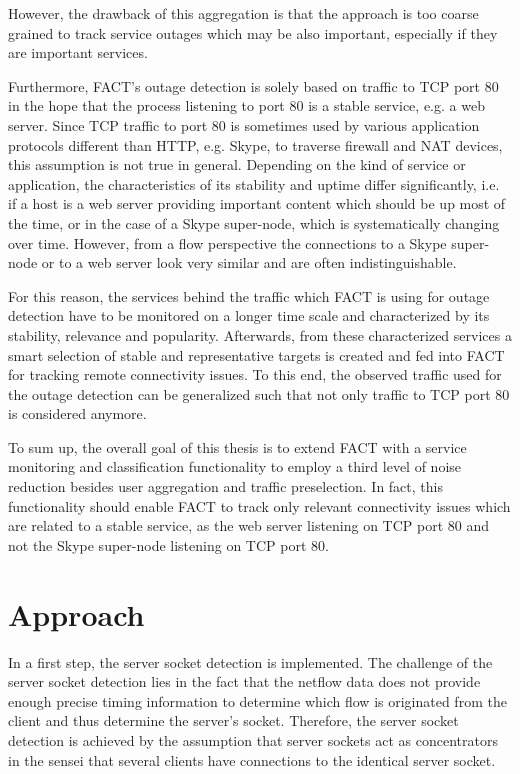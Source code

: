 \documentclass{sigcomm-alternate}
\begin{document}
However, the drawback of this aggregation is that the approach is too
coarse grained to track service outages which may be also important,
especially if they are important services.

Furthermore, FACT's outage detection is solely based on traffic to
TCP port 80 in the hope that the process listening to port 80 is a
stable service, e.g. a web server. Since TCP traffic to port 80 is
sometimes used by various application protocols different than HTTP,
e.g. Skype, to traverse firewall and NAT devices, this assumption is
not true in general. Depending on the kind of service or application,
the characteristics of its stability and uptime differ significantly,
i.e. if a host is a web server providing important content which should
be up most of the time, or in the case of a Skype super-node, which is
systematically changing over time. However, from a flow perspective the
connections to a Skype super-node or to a web server look very similar
and are often indistinguishable.

For this reason, the services behind the traffic which FACT is using
for outage detection have to be monitored on a longer time scale and
characterized by its stability, relevance and popularity. Afterwards,
from these characterized services a smart selection of stable and
representative targets is created and fed into FACT for tracking remote
connectivity issues. To this end, the observed traffic used for the
outage detection can be generalized such that not only traffic to TCP
port 80 is considered anymore.

To sum up, the overall goal of this thesis is to extend FACT with
a service monitoring and classification functionality to employ a
third level of noise reduction besides user aggregation and traffic
preselection. In fact, this functionality should enable FACT to track
only relevant connectivity issues which are related to a stable service,
as the web server listening on TCP port 80 and not the Skype super-node
listening on TCP port 80.

\section{Approach}

In a first step, the server socket detection is implemented. The
challenge of the server socket detection lies in the fact that the
netflow data does not provide enough precise timing information to
determine which flow is originated from the client and thus determine
the server's socket. Therefore, the server socket detection is achieved
by the assumption that server sockets act as concentrators in the sensei
that several clients have connections to the identical server socket.
\end{document}
